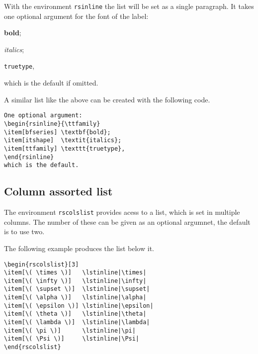 \documentclass[   %
  final,          %
  a4paper,        %
  portrait,       %
  rscols=3,       %
  margin=1.0cm,   %
  titlepage,      %
]{refsheet}
\newcommand\mybackslash{\char`\\}
\begin{document}
With the environment \texttt{rsinline} the list will be
set as a single paragraph.
It takes one optional argument for the font of the label:
\begin{rsinline}%
\item[\mybackslash{}bfseries] \textbf{bold};
\item[\mybackslash{}itshape]  \textit{italics};
\item[\mybackslash{}ttfamily] \texttt{truetype},
\end{rsinline}
which is the default if omitted.

A similar list like the above can be created with the following code.

\begin{lstlisting}
One optional argument:
\begin{rsinline}{\ttfamily}
\item[bfseries] \textbf{bold};
\item[itshape]  \textit{italics};
\item[ttfamily] \texttt{truetype},
\end{rsinline}
which is the default.
\end{lstlisting}

\subsection{Column assorted list}

The environment \texttt{rscolslist} provides acess to a list, 
which is set in multiple columns.
The number of these can be given as an optional argumnet,
the default is to use two.

The following example produces the list below it.

\begin{lstlisting}
\begin{rscolslist}[3]
\item[\( \times \)]   \lstinline|\times| 
\item[\( \infty \)]   \lstinline|\infty| 
\item[\( \supset \)]  \lstinline|\supset|
\item[\( \alpha \)]   \lstinline|\alpha| 
\item[\( \epsilon \)] \lstinline|\epsilon|
\item[\( \theta \)]   \lstinline|\theta| 
\item[\( \lambda \)]  \lstinline|\lambda|
\item[\( \pi \)]      \lstinline|\pi| 
\item[\( \Psi \)]     \lstinline|\Psi|
\end{rscolslist}
\end{lstlisting}
\end{document}
